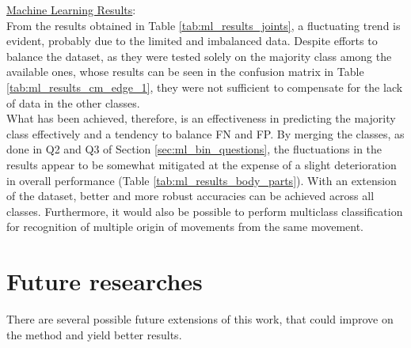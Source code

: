 \underline{Machine Learning Results}:\\
From the results obtained in Table \ref{tab:ml_results_joints}, a fluctuating trend is evident, probably due to the limited and imbalanced data. 
Despite efforts to balance the dataset, as they were tested solely on the majority class among the available ones, whose results can be seen in the confusion matrix in Table \ref{tab:ml_results_cm_edge_1}, 
they were not sufficient to compensate for the lack of data in the other classes. \\
What has been achieved, therefore, is an effectiveness in predicting the majority class effectively and a tendency to balance FN and FP. 
By merging the classes, as done in Q2 and Q3 of Section \ref{sec:ml_bin_questions}, the fluctuations in the results appear to be somewhat mitigated at the expense of a slight deterioration in overall performance (Table \ref{tab:ml_results_body_parts}).
With an extension of the dataset, better and more robust accuracies can be achieved across all classes.
Furthermore, it would also be possible to perform multiclass classification for recognition of multiple origin of movements from the same movement.\\

\section{Future researches}
\label{sec:future_researches}
There are several possible future extensions of this work, that could improve on the method and yield better results. \\

